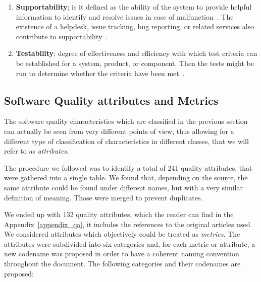 \begin{enumerate}
    \item \textbf{Supportability}; is it defined as the ability of the system to provide helpful information  to identify and resolve issues in case of malfunction~\cite{microsoft_2010}. The existence of a helpdesk,  issue tracking, bug reporting, or related services also contribute to supportability~\cite{orviz_fernandez_eosc-synergy_2020}.

    \item \textbf{Testability}; degree of effectiveness and efficiency with which test criteria can be established for a system, product, or component. Then the tests might be run to determine whether the criteria have been met~\cite{iso_25010_2011_2017}.
\end{enumerate}

\subsection{Software Quality attributes and Metrics}
\label{subsec:SW_quality_attributes}

The software quality characteristics which are classified in the previous section can actually be seen from very different points of view, thus allowing for a different type of classification of characteristics in different classes, that we will refer to as \textit{attributes}.

The procedure we followed was to identify a total of 241 quality attributes, that were gathered into a single table. We found that, depending on the source, the same attribute could be found under different names, but with a very similar definition of meaning. Those were merged to prevent duplicates.

We ended up with 132 quality attributes, which the reader can find in the Appendix~\ref{appendix_qa}, it includes the references to the original articles used. We considered attributes which objectively could be treated as \textit{metrics}. The attributes were subdivided into six categories and, for each metric or attribute, a new codename was proposed in order to have a coherent naming convention throughout the document. The following categories and their codenames are proposed:

